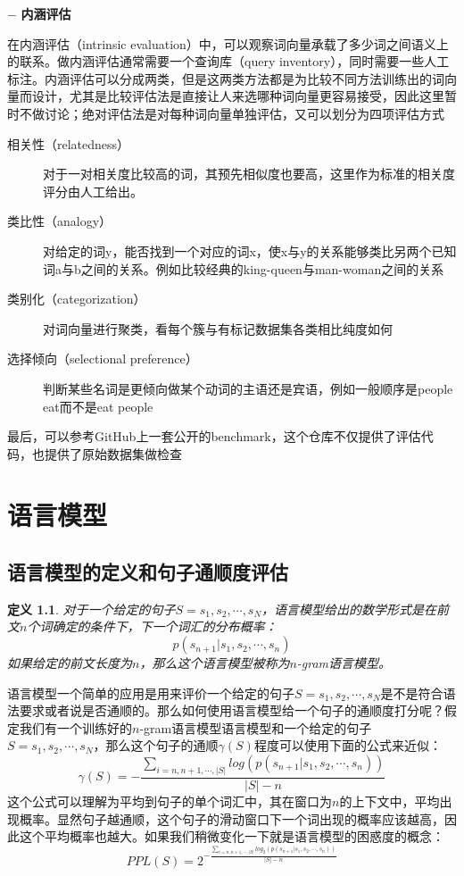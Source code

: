 \documentclass[twoside,a4paper,12pt]{book}%
\newtheorem{definition}{定义}
\begin{document}
$-$ \textbf{内涵评估}

在内涵评估（intrinsic evaluation）中，可以观察词向量承载了多少词之间语义上的联系。做内涵评估通常需要一个查询库（query inventory），同时需要一些人工标注。内涵评估可以分成两类，但是这两类方法都是为比较不同方法训练出的词向量而设计，尤其是比较评估法是直接让人来选哪种词向量更容易接受，因此这里暂时不做讨论；绝对评估法是对每种词向量单独评估，又可以划分为四项评估方式
\begin{description}
\item [相关性（relatedness）]对于一对相关度比较高的词，其预先相似度也要高，这里作为标准的相关度评分由人工给出。
\item [类比性（analogy）]对给定的词y，能否找到一个对应的词x，使x与y的关系能够类比另两个已知词a与b之间的关系。例如比较经典的king-queen与man-woman之间的关系
\item [类别化（categorization）]对词向量进行聚类，看每个簇与有标记数据集各类相比纯度如何
\item [选择倾向（selectional preference）]判断某些名词是更倾向做某个动词的主语还是宾语，例如一般顺序是people eat而不是eat people
\end{description}

最后，可以参考GitHub上一套公开的benchmark，这个仓库不仅提供了评估代码，也提供了原始数据集做检查
\chapter{语言模型}
\section{语言模型的定义和句子通顺度评估}
\begin{definition}
对于一个给定的句子$S=s_1,s_2,\cdots ,s_N$，语言模型给出的数学形式是在前文$n$个词确定的条件下，下一个词汇的分布概率：
$$
p(s_{n+1}|s_1,s_2,\cdots,s_n)
$$
如果给定的前文长度为$n$，那么这个语言模型被称为$n$-gram语言模型。
\end{definition}

语言模型一个简单的应用是用来评价一个给定的句子$S=s_1,s_2,\cdots ,s_N$是不是符合语法要求或者说是否通顺的。那么如何使用语言模型给一个句子的通顺度打分呢？假定我们有一个训练好的$n$-gram语言模型语言模型和一个给定的句子$S=s_1,s_2,\cdots ,s_N$，那么这个句子的通顺$\gamma(S)$程度可以使用下面的公式来近似：
$$
\gamma(S) = -\frac{\sum_{i=n, n+1, \cdots, |S|}log(p(s_{n+1}|s_1,s_2,\cdots,s_n))}{|S|-n}
$$
这个公式可以理解为平均到句子的单个词汇中，其在窗口为$n$的上下文中，平均出现概率。显然句子越通顺，这个句子的滑动窗口下一个词出现的概率应该越高，因此这个平均概率也越大。如果我们稍微变化一下就是语言模型的困惑度的概念：
$$
PPL(S) =2^{ -\frac{\sum_{i=n, n+1, \cdots, |S|}log_2(p(s_{n+1}|s_1,s_2,\cdots,s_n))}{|S|-n}}
$$
\end{document}
